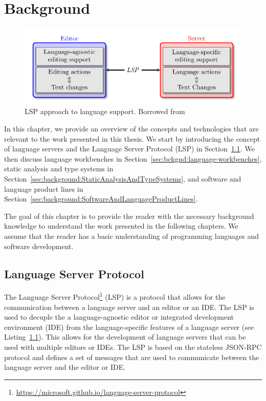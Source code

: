 \chapter{Background}\label{chap:Background}

\begin{figure}[t]
    \centering
    \includegraphics[width=0.9\linewidth]{figs/background/lsp_diagram.pdf}
    \caption{LSP approach to language support. Borrowed from~\cite{Rodriguez-Echeverria18a}}
    \label{lst:lsp}
\end{figure}

In this chapter, we provide an overview of the concepts and technologies that are relevant to the work presented in this thesis. We start by introducing the concept of language servers and the Language Server Protocol (LSP) in Section~\ref{sec:background:LanguageServerProtocol}. We then discuss language workbenches in Section~\ref{sec:bckgnd:language-workbenches}, static analysis and type systems in Section~\ref{sec:background:StaticAnalysisAndTypeSystems}, and software and language product lines in Section~\ref{sec:background:SoftwareAndLanguageProductLines}.

The goal of this chapter is to provide the reader with the necessary background knowledge to understand the work presented in the following chapters. We assume that the reader has a basic understanding of programming languages and software development.

\section{Language Server Protocol}\label{sec:background:LanguageServerProtocol}
The Language Server Protocol\footnote{\url{https://microsoft.github.io/language-server-protocol}} (LSP) is a protocol that allows for the communication between a language server and an editor or an IDE. The LSP is used to decuple the a language-agnostic editor or integrated development environment (IDE) from the language-specific features of a language server (see Listing~\ref{lst:lsp}). This allows for the development of language servers that can be used with multiple editors or IDEs. The LSP is based on the stateless JSON-RPC protocol and defines a set of messages that are used to communicate between the language server and the editor or IDE.

